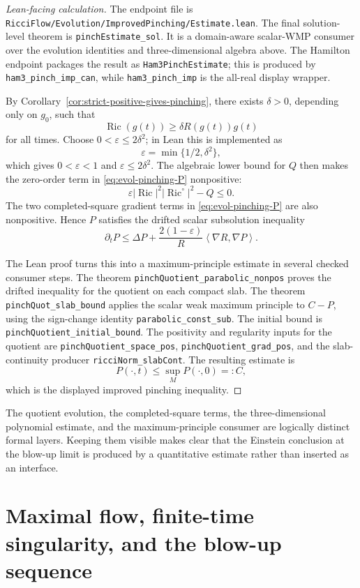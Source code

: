 \documentclass[11pt]{article}
\theoremstyle{plain}
\theoremstyle{definition}
\theoremstyle{remark}
\newcommand{\Ric}{\operatorname{Ric}}
\newcommand{\ip}[2]{\left\langle #1,#2\right\rangle}
\newcommand{\norm}[1]{\left|#1\right|}
\newcommand{\eps}{\varepsilon}
\newcommand{\del}{\delta}
\newcommand{\leanref}[1]{\nolinkurl{#1}}
\newcommand{\leanfile}[1]{\nolinkurl{#1}}
\newcommand{\rffile}[1]{\leanfile{#1}}
\begin{document}
\begin{proof}[Lean-facing calculation]
The endpoint file is
\rffile{RicciFlow/Evolution/ImprovedPinching/Estimate.lean}.  The final solution-level theorem
is \leanref{pinchEstimate_sol}.  It is a domain-aware scalar-WMP consumer over
the evolution identities and three-dimensional algebra above.  The Hamilton
endpoint packages the result as \leanref{Ham3PinchEstimate}; this is produced
by \leanref{ham3_pinch_imp_can}, while \leanref{ham3_pinch_imp} is the
all-real display wrapper.

By Corollary~\ref{cor:strict-positive-gives-pinching}, there exists
\(\del>0\), depending only on \(g_0\), such that
\[
\Ric(g(t))\ge\del R(g(t))g(t)
\]
for all times.  Choose \(0<\eps\le2\del^2\); in Lean this is implemented as
\[
  \eps=\min\{1/2,\del^2\},
\]
which gives \(0<\eps<1\) and \(\eps\le2\del^2\).  The algebraic lower bound
for \(Q\) then makes the zero-order term in \eqref{eq:evol-pinching-P}
nonpositive:
\[
  \eps\norm{\Ric}^2\norm{\Ric^\circ}^2-Q\le0.
\]
The two completed-square gradient terms in \eqref{eq:evol-pinching-P} are also
nonpositive.  Hence \(P\) satisfies the drifted scalar subsolution inequality
\[
\partial_tP
\le
\Delta P+
\frac{2(1-\eps)}{R}\ip{\nabla R}{\nabla P}.
\]

The Lean proof turns this into a maximum-principle estimate in several checked
consumer steps.  The theorem \leanref{pinchQuotient_parabolic_nonpos} proves
the drifted inequality for the quotient on each compact slab.  The theorem
\leanref{pinchQuot_slab_bound} applies the scalar weak maximum principle to
\(C-P\), using the sign-change identity \leanref{parabolic_const_sub}.
The initial bound is \leanref{pinchQuotient_initial_bound}.  The positivity and
regularity inputs for the quotient are \leanref{pinchQuotient_space_pos},
\leanref{pinchQuotient_grad_pos}, and the slab-continuity producer
\leanref{ricciNorm_slabCont}.  The resulting estimate is
\[
  P(\cdot,t)\le \sup_M P(\cdot,0)=:C,
\]
which is the displayed improved pinching inequality.
\end{proof}

The quotient evolution, the completed-square terms, the three-dimensional
polynomial estimate, and the maximum-principle consumer are logically distinct
formal layers.  Keeping them visible makes clear that the Einstein conclusion
at the blow-up limit is produced by a quantitative estimate rather than
inserted as an interface.
\section{Maximal flow, finite-time singularity, and the blow-up sequence}
\label{sec:maximal-flow-blowup}
\end{document}
